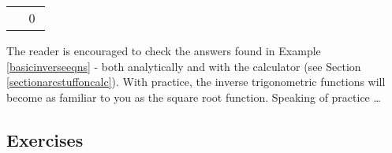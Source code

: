 \documentclass[12pt]{ximera}
\begin{document}
\begin{example}
\begin{enumerate}
\begin{tabular}{cc}



&

\hspace{-.15in}

 \qed \\


\end{tabular}

\end{enumerate}

\end{example}


 The reader is encouraged to check the answers found in Example \ref{basicinverseeqns} - both analytically and with the calculator (see Section \ref{sectionarcstuffoncalc}).  With practice, the inverse trigonometric functions will become as familiar to you as the square root function.  Speaking of practice \dots




\subsection{Exercises}
\end{document}
